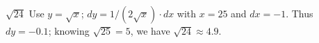 {$\sqrt{24}$
}
{Use $y = \sqrt{x}$; $dy = 1/(2\sqrt{x})\cdot dx$ with $x=25$ and $dx = -1$. Thus $dy = -0.1$; knowing $\sqrt{25}=5$, we have $\sqrt{24} \approx 4.9$.
}

